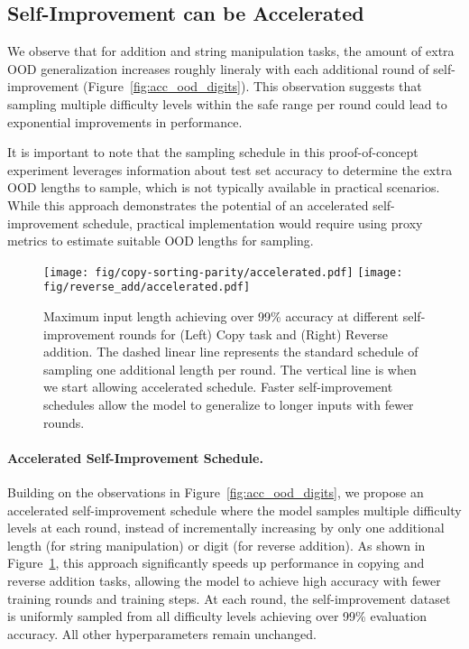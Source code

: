 \subsection{Self-Improvement can be Accelerated}\label{sec:accelerate}
We observe that for addition and string manipulation tasks, the amount of extra OOD generalization increases roughly lineraly with each additional round of self-improvement (Figure~\ref{fig:acc_ood_digits}). This observation suggests that sampling multiple difficulty levels within the safe range per round could lead to exponential improvements in performance.

It is important to note that the sampling schedule in this proof-of-concept experiment leverages information about test set accuracy to determine the extra OOD lengths to sample, which is not typically available in practical scenarios. While this approach demonstrates the potential of an accelerated self-improvement schedule, practical implementation would require using proxy metrics to estimate suitable OOD lengths for sampling.

\begin{figure}
    \centering
    \texttt{[image: fig/copy-sorting-parity/accelerated.pdf]}
    \texttt{[image: fig/reverse\_add/accelerated.pdf]}
    \caption{Maximum input length achieving over 99\% accuracy at different self-improvement rounds for (Left) Copy task and (Right) Reverse addition. The dashed linear line represents the standard schedule of sampling one additional length per round. The vertical line is when we start allowing accelerated schedule. Faster self-improvement schedules allow the model to generalize to longer inputs with fewer rounds.}
    \label{fig:fast_copy_add}
\end{figure}



\paragraph{Accelerated Self-Improvement Schedule.}
Building on the observations in Figure~\ref{fig:acc_ood_digits}, we propose an accelerated self-improvement schedule where the model samples multiple difficulty levels at each round, instead of incrementally increasing by only one additional length (for string manipulation) or digit (for reverse addition). As shown in Figure~\ref{fig:fast_copy_add}, this approach significantly speeds up performance in copying and reverse addition tasks, allowing the model to achieve high accuracy with fewer training rounds and training steps. At each round, the self-improvement dataset is uniformly sampled from all difficulty levels achieving over 99\% evaluation accuracy. All other hyperparameters remain unchanged.

